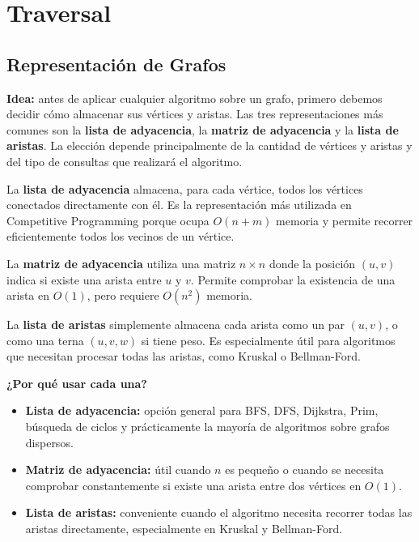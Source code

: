 \documentclass[10pt,a4paper,twocolumn]{article}
\begin{document}

\section{Traversal}


\subsection{Representación de Grafos}

\textbf{Idea:} antes de aplicar cualquier algoritmo sobre un grafo,
primero debemos decidir cómo almacenar sus vértices y aristas. Las
tres representaciones más comunes son la \textbf{lista de adyacencia},
la \textbf{matriz de adyacencia} y la \textbf{lista de aristas}. La
elección depende principalmente de la cantidad de vértices y aristas
y del tipo de consultas que realizará el algoritmo.

La \textbf{lista de adyacencia} almacena, para cada vértice, todos los
vértices conectados directamente con él. Es la representación más
utilizada en Competitive Programming porque ocupa $O(n+m)$ memoria y
permite recorrer eficientemente todos los vecinos de un vértice.

La \textbf{matriz de adyacencia} utiliza una matriz $n\times n$ donde
la posición $(u,v)$ indica si existe una arista entre $u$ y $v$.
Permite comprobar la existencia de una arista en $O(1)$, pero requiere
$O(n^2)$ memoria.

La \textbf{lista de aristas} simplemente almacena cada arista como un
par $(u,v)$, o como una terna $(u,v,w)$ si tiene peso. Es especialmente
útil para algoritmos que necesitan procesar todas las aristas, como
Kruskal o Bellman-Ford.

\textbf{¿Por qué usar cada una?}

\begin{itemize}
    \item \textbf{Lista de adyacencia:} opción general para BFS, DFS,
    Dijkstra, Prim, búsqueda de ciclos y prácticamente la mayoría de
    algoritmos sobre grafos dispersos.

    \item \textbf{Matriz de adyacencia:} útil cuando $n$ es pequeño o
    cuando se necesita comprobar constantemente si existe una arista
    entre dos vértices en $O(1)$.

    \item \textbf{Lista de aristas:} conveniente cuando el algoritmo
    necesita recorrer todas las aristas directamente, especialmente
    en Kruskal y Bellman-Ford.
\end{itemize}
\end{document}
